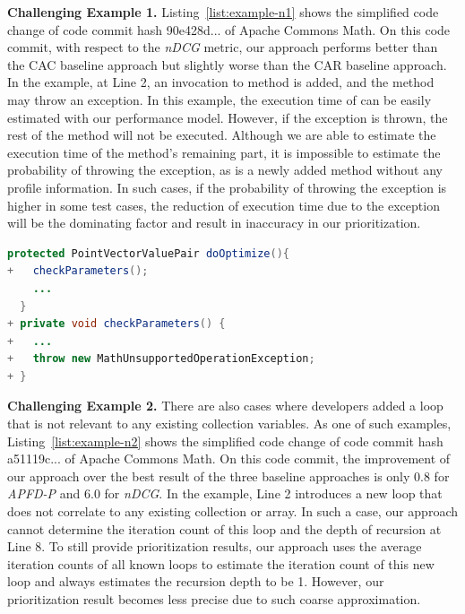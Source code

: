 \textbf{Challenging Example 1.} Listing~\ref{list:example-n1} shows the simplified code change of code commit hash 90e428d... of Apache Commons Math. On this code commit, with respect to the \textit{nDCG} metric, our approach performs better than the CAC baseline approach but slightly worse than the CAR baseline approach. In the example, at Line 2, an invocation to method  is added, and the method may throw an exception. In this example, the execution time of  can be easily estimated with our performance model. However, if the exception is thrown, the rest of the method will not be executed. Although we are able to estimate the execution time of the method's remaining part, it is impossible to estimate the probability of throwing the exception, as  is a newly added method without any profile information. In such cases, if the probability of throwing the exception is higher in some test cases, the reduction of execution time due to the exception will be the dominating factor and result in inaccuracy in our prioritization.\\ 


{\fontsize{10}{10}
\begin{lstlisting}[columns=flexible,language=Java,caption=Return or Throw Exception at Beginning, label={list:example-n1}]
  protected PointVectorValuePair doOptimize(){
+   checkParameters();
    ...	
  }
+ private void checkParameters() {
+   ...
+   throw new MathUnsupportedOperationException;
+ }
\end{lstlisting}
}


\textbf{Challenging Example 2.} There are also cases where developers added a loop that is not relevant to any existing collection variables. As one of such examples, Listing~\ref{list:example-n2} shows the simplified code change of code commit hash a51119c... of Apache Commons Math. On this code commit, the improvement of our approach over the best result of the three baseline approaches is only 0.8 for \textit{APFD-P} and 6.0 for \textit{nDCG}. 
%
In the example, Line 2 introduces a new loop that does not correlate to any existing collection or array. In such a case, our approach cannot determine the iteration count of this loop and the depth of recursion at Line 8. To still provide prioritization results, our approach uses the average iteration counts of all known loops to estimate the iteration count of this new loop and always estimates the recursion depth to be 1. However, our prioritization result becomes less precise due to such coarse approximation.\\

